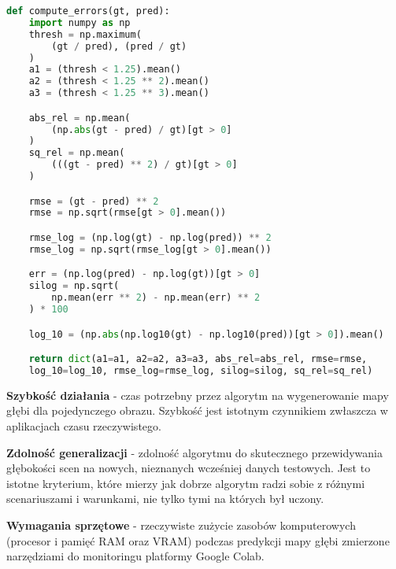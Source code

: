 \begin{lstlisting}[style=EEStyle,language=python,numbers=none,frame=none]
def compute_errors(gt, pred):
    import numpy as np
    thresh = np.maximum(
        (gt / pred), (pred / gt)
    )
    a1 = (thresh < 1.25).mean()
    a2 = (thresh < 1.25 ** 2).mean()
    a3 = (thresh < 1.25 ** 3).mean()

    abs_rel = np.mean(
        (np.abs(gt - pred) / gt)[gt > 0]
    )
    sq_rel = np.mean(
        (((gt - pred) ** 2) / gt)[gt > 0]
    )

    rmse = (gt - pred) ** 2
    rmse = np.sqrt(rmse[gt > 0].mean())

    rmse_log = (np.log(gt) - np.log(pred)) ** 2
    rmse_log = np.sqrt(rmse_log[gt > 0].mean())

    err = (np.log(pred) - np.log(gt))[gt > 0]
    silog = np.sqrt(
        np.mean(err ** 2) - np.mean(err) ** 2
    ) * 100

    log_10 = (np.abs(np.log10(gt) - np.log10(pred))[gt > 0]).mean()

    return dict(a1=a1, a2=a2, a3=a3, abs_rel=abs_rel, rmse=rmse,
    log_10=log_10, rmse_log=rmse_log, silog=silog, sq_rel=sq_rel)
\end{lstlisting}

\textbf{Szybkość działania} - czas potrzebny przez algorytm na wygenerowanie mapy głębi dla pojedynczego obrazu. Szybkość jest istotnym czynnikiem zwłaszcza w aplikacjach czasu rzeczywistego.

\textbf{Zdolność generalizacji} - zdolność algorytmu do skutecznego przewidywania głębokości scen na nowych, nieznanych wcześniej danych testowych. Jest to istotne kryterium, które mierzy jak dobrze algorytm radzi sobie z różnymi scenariuszami i warunkami, nie tylko tymi na których był uczony.

\textbf{Wymagania sprzętowe} - rzeczywiste zużycie zasobów komputerowych (procesor i pamięć RAM oraz VRAM) podczas predykcji mapy głębi zmierzone narzędziami do monitoringu platformy Google Colab.

